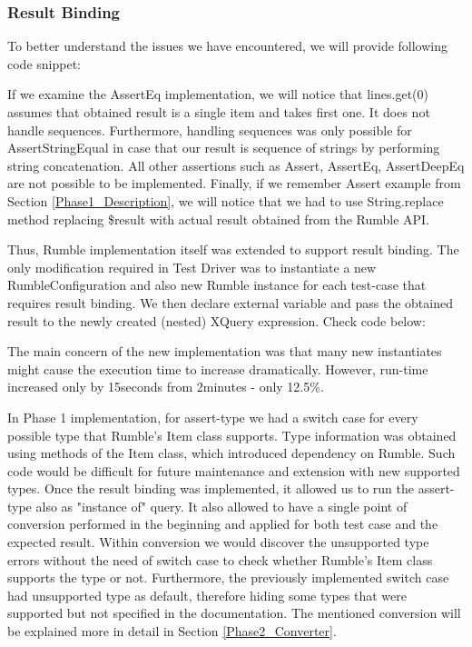 \subsubsection{Result Binding}
To better understand the issues we have encountered, we will provide following code snippet:



If we examine the AssertEq implementation, we will notice that lines.get(0) assumes that obtained result is a single item and takes first one. It does not handle sequences. Furthermore, handling sequences was only possible for AssertStringEqual in case that our result is sequence of strings by performing string concatenation. All other assertions such as Assert, AssertEq, AssertDeepEq are not possible to be implemented. Finally, if we remember Assert example from Section \ref{Phase1_Description}, we will notice that we had to use String.replace method replacing \$result with actual result obtained from the Rumble API. 

Thus, Rumble implementation itself was extended to support result binding. The only modification required in Test Driver was to instantiate a new RumbleConfiguration and also new Rumble instance for each test-case that requires result binding. We then declare external variable and pass the obtained result to the newly created (nested) XQuery expression. Check code below:



The main concern of the new implementation was that many new instantiates might cause the execution time to increase dramatically. However, run-time increased only by 15seconds from 2minutes - only 12.5\%.

In Phase 1 implementation, for assert-type we had a switch case for every possible type that Rumble's Item class supports. Type information was obtained using methods of the Item class, which introduced dependency on Rumble. Such code would be difficult for future maintenance and extension with new supported types. Once the result binding was implemented, it allowed us to run the assert-type also as "instance of" query. It also allowed to have a single point of conversion performed in the beginning and applied for both test case and the expected result. Within conversion we would discover the unsupported type errors without the need of switch case to check whether Rumble's Item class supports the type or not. Furthermore, the previously implemented switch case had unsupported type as default, therefore hiding some types that were supported but not specified in the documentation. The mentioned conversion will be explained more in detail in Section \ref{Phase2_Converter}. 

